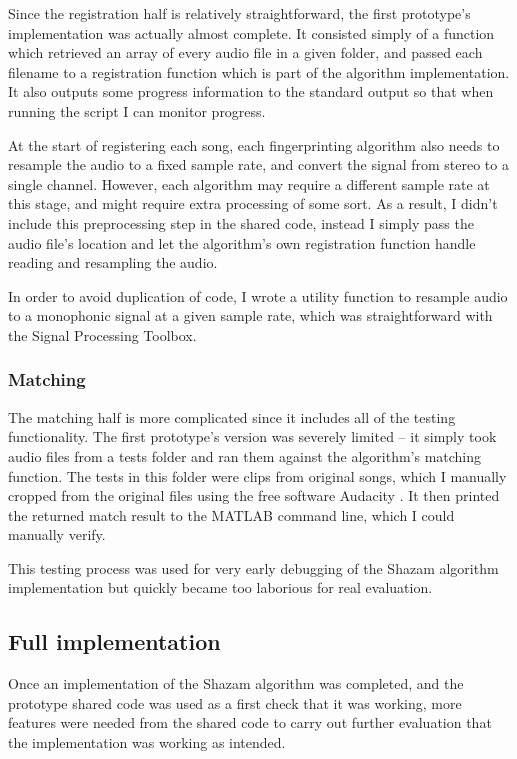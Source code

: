 \documentclass[12pt,a4paper,twoside,openright]{report}
\begin{document}
Since the registration half is relatively straightforward, the first prototype's implementation was actually almost complete. It consisted simply of a function which retrieved an array of every audio file in a given folder, and passed each filename to a registration function which is part of the algorithm implementation. It also outputs some progress information to the standard output so that when running the script I can monitor progress.

At the start of registering each song, each fingerprinting algorithm also needs to resample the audio to a fixed sample rate, and convert the signal from stereo to a single channel. However, each algorithm may require a different sample rate at this stage, and might require extra processing of some sort. As a result, I didn't include this preprocessing step in the shared code, instead I simply pass the audio file's location and let the algorithm's own registration function handle reading and resampling the audio.

In order to avoid duplication of code, I wrote a utility function to resample audio to a monophonic signal at a given sample rate, which was straightforward with the Signal Processing Toolbox.

\subsubsection{Matching}

The matching half is more complicated since it includes all of the testing functionality. The first prototype's version was severely limited -- it simply took audio files from a tests folder and ran them against the algorithm's matching function. The tests in this folder were clips from original songs, which I manually cropped from the original files using the free software Audacity \cite{Audacity}. It then printed the returned match result to the MATLAB command line, which I could manually verify.

This testing process was used for very early debugging of the Shazam algorithm implementation but quickly became too laborious for real evaluation.


\subsection{Full implementation}

Once an implementation of the Shazam algorithm was completed, and the prototype shared code was used as a first check that it was working, more features were needed from the shared code to carry out further evaluation that the implementation was working as intended.
\end{document}
